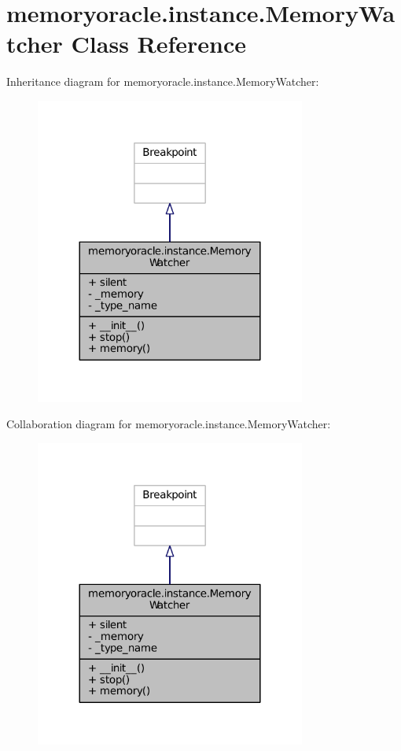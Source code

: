 \hypertarget{classmemoryoracle_1_1instance_1_1MemoryWatcher}{}\section{memoryoracle.\+instance.\+Memory\+Watcher Class Reference}
\label{classmemoryoracle_1_1instance_1_1MemoryWatcher}


Inheritance diagram for memoryoracle.\+instance.\+Memory\+Watcher\+:
\nopagebreak
\begin{figure}[H]
\begin{center}
\leavevmode
\includegraphics[width=252pt]{classmemoryoracle_1_1instance_1_1MemoryWatcher__inherit__graph}
\end{center}
\end{figure}


Collaboration diagram for memoryoracle.\+instance.\+Memory\+Watcher\+:
\nopagebreak
\begin{figure}[H]
\begin{center}
\leavevmode
\includegraphics[width=252pt]{classmemoryoracle_1_1instance_1_1MemoryWatcher__coll__graph}
\end{center}
\end{figure}
